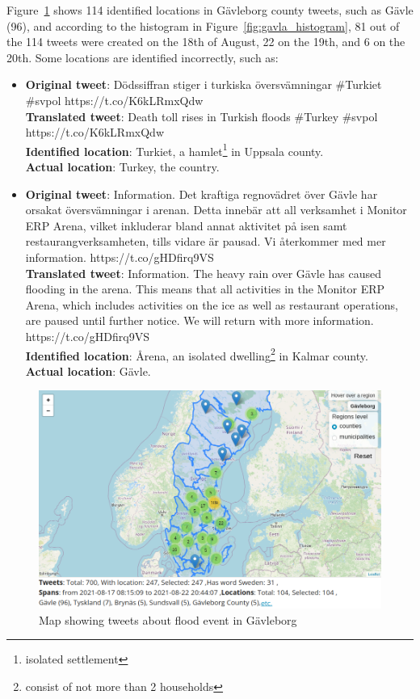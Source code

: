 Figure~\ref{fig:gavle_map} shows 114 identified locations in Gävleborg county tweets, such as Gävle (96), and
according to the histogram in Figure~\ref{fig:gavla_histogram}, 81 out of the 114 tweets were created on the 18th of August,
22 on the 19th, and 6 on the 20th. Some locations are identified incorrectly, such as:
\begin{itemize}
  \item \textbf{Original tweet}: Dödssiffran stiger i turkiska översvämningar \#Turkiet \#svpol
    https://t.co/K6kLRmxQdw \\
  \textbf{Translated tweet}: Death toll rises in Turkish floods \#Turkey \#svpol \\
    https://t.co/K6kLRmxQdw \\
    \textbf{Identified location}: Turkiet, a hamlet\footnote{isolated settlement} in Uppsala county. \\
    \textbf{Actual location}: Turkey, the country.

  \item \textbf{Original tweet}: Information. Det kraftiga regnovädret över Gävle har orsakat
    översvämningar i arenan. Detta innebär att all verksamhet i Monitor ERP Arena, vilket inkluderar
    bland annat aktivitet på isen samt restaurangverksamheten, tills vidare är pausad. Vi återkommer
    med mer information. https://t.co/gHDfirq9VS \\
    \textbf{Translated tweet}: Information. The heavy rain over Gävle has caused flooding in the arena.
    This means that all activities in the Monitor ERP Arena, which includes activities on the ice as
    well as restaurant operations, are paused until further notice. We will return with more
    information. https://t.co/gHDfirq9VS \\
    \textbf{Identified location}: Årena, an isolated dwelling\footnote{consist of not more than 2 households}
    in Kalmar county. \\
    \textbf{Actual location}: Gävle.


\end{itemize}

\begin{figure}[H]
  \begin{center}
    \includegraphics[width=\columnwidth]{./images/gavle_map.png}
  \end{center}
  \caption{Map showing tweets about flood event in Gävleborg}
  \label{fig:gavle_map}
\end{figure}

